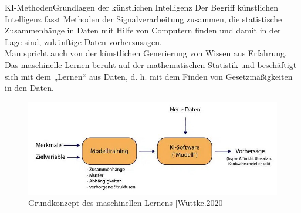 \documentclass[169, handout	]{THIbeamer} %
\begin{document}
	\begin{frame}{KI-Methoden}{Grundlagen der künstlichen Intelligenz}
		\footnotesize
		Der Begriff künstlichen Intelligenz fasst Methoden der Signalverarbeitung zusammen, die statistische Zusammenhänge in Daten mit Hilfe von Computern finden und damit in der Lage sind, zukünftige Daten vorherzusagen.\\ Man spricht auch von der künstlichen Generierung von Wissen aus Erfahrung. Das maschinelle Lernen beruht auf der mathematischen Statistik und beschäftigt sich mit dem „Lernen“ aus Daten, d. h. mit dem Finden von Gesetzmäßigkeiten in den Daten.\\
		\begin{figure}
			\includegraphics[scale=0.45]{required/ML_Einfuhrung.jpg}
			\caption{Grundkonzept des maschinellen Lernens [Wuttke.2020]}
        	\label{Ground Subtraction}
       	\end{figure}

	\end{frame}
\end{document}
